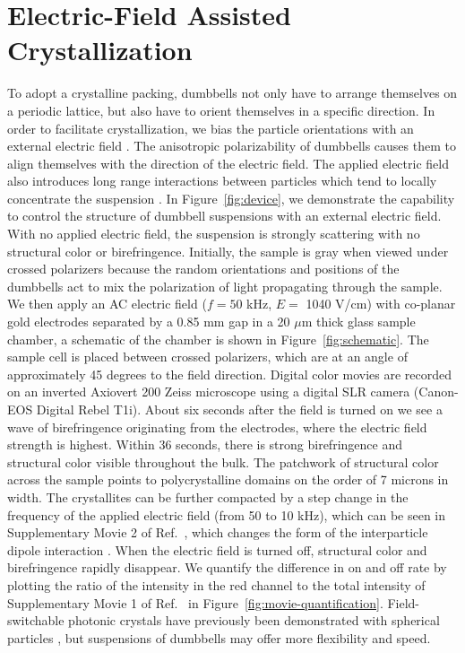 \section{Electric-Field Assisted Crystallization}

To adopt a crystalline packing, dumbbells not only have to arrange themselves on a periodic lattice, but also have to orient themselves in a specific direction.
In order to facilitate crystallization, we bias the particle orientations with an external electric field \cite{Mittal2009, Grzelczak2010, Demirors2010}.
The anisotropic polarizability of dumbbells causes them to align themselves with the direction of the electric field.
The applied electric field also introduces long range interactions between particles which tend to locally concentrate the suspension \cite{Fraden1989, Yethiraj2003, Gong2003, Mittal2008}.
In Figure~\ref{fig:device}, we demonstrate the capability to control the structure  of dumbbell suspensions with an external electric  field.
With no applied electric field, the suspension is strongly scattering with no structural color or birefringence.
Initially, the sample is gray when viewed under crossed polarizers because the random orientations and positions of the dumbbells act to mix the polarization of light propagating through the sample.
We then apply an AC electric field ($f=50$ kHz, $E=$ 1040 V/cm) with co-planar gold electrodes separated by a 0.85 mm gap in a 20 $\mu$m thick glass sample chamber, a schematic of the chamber is shown in Figure~\ref{fig:schematic}.
The sample cell is placed between crossed polarizers, which are at an angle of approximately 45 degrees to the field direction.
Digital color movies are recorded on an inverted Axiovert 200 Zeiss microscope using a digital SLR camera (Canon-EOS Digital Rebel T1i).
About six seconds after the field is turned on we see a wave of birefringence originating from the electrodes, where the electric field strength is highest.
Within 36 seconds, there is strong birefringence and structural color visible throughout the bulk.
The patchwork of structural color across the sample points to polycrystalline domains on the order of 7 microns in width.
The crystallites can be further compacted by a step change in the frequency of the applied electric field (from 50 to 10 kHz), which can be seen in Supplementary Movie 2 of Ref.~\cite{Forster:2011}, which changes the form of the interparticle dipole interaction \cite{Mittal2008}.
When the electric field is turned off,  structural color and birefringence rapidly disappear.
We quantify the difference in on and off rate by plotting the ratio of the intensity in the red channel to the total intensity of Supplementary Movie 1 of Ref.~\cite{Forster:2011} in Figure~\ref{fig:movie-quantification}.
Field-switchable photonic crystals have previously been demonstrated with spherical particles \cite{Lumsdon2003}, but suspensions of dumbbells may offer more flexibility and speed.

